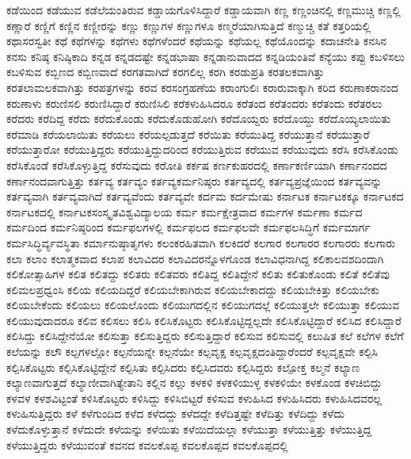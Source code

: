 {ಕಡೆಯಿಂದ
ಕಡೆಯುವ
ಕಡೆಲೆಯಂತಿರುವ
ಕಡ್ಡಾಯಗೊಳಿಸಿದ್ದಾರೆ
ಕಡ್ಡಾಯವಾಗಿ
ಕಣ್ಣ
ಕಣ್ಣಂಚಿನಲ್ಲಿ
ಕಣ್ಣಮುಚ್ಚಿ
ಕಣ್ಣಲ್ಲಿ
ಕಣ್ಣಾರೆ
ಕಣ್ಣಿಗೆ
ಕಣ್ಣಿನ
ಕಣ್ಣೀರನ್ನು
ಕಣ್ಣು
ಕಣ್ಣುಗಳ
ಕಣ್ಣುಗಳೂ
ಕಣ್ಮರೆಯಾಗಿಸುತ್ತಿದೆ
ಕಣ್ಮುಚ್ಚಿ
ಕತೆ
ಕತ್ತರಿಯಲ್ಲಿ
ಕಥಾಸರಸ್ವತೀ
ಕಥೆ
ಕಥೆಗಳನ್ನು
ಕಥೆಗಳು
ಕಥೆಗಳೆಂದರೆ
ಕಥೆಯನ್ನು
ಕಥೆಯಲ್ಲ
ಕಥೆಯೊಂದನ್ನು
ಕದಾಚನೇತಿ
ಕನಸಿನ
ಕನಸು
ಕನಿಷ್ಠ
ಕನಿಷ್ಠಿಕಾದಿ
ಕನ್ನಡ
ಕನ್ನಡದಷ್ಟೇ
ಕನ್ನಡಭಾಷಾ
ಕನ್ನಡಾನುವಾದದ
ಕನ್ನಡಿಯಂತಿವೆ
ಕನ್ಯೆಯು
ಕಪ್ಪು
ಕಬಳಿಸಲು
ಕಬಳಿಸುವ
ಕಬ್ಬಿಣದ
ಕಬ್ಬಿಣವಾದೆ
ಕರಗತವಾಗಿದೆ
ಕರಗಲಿಲ್ಲ
ಕರಗಿ
ಕರಡುಪ್ರತಿ
ಕರತಲಕವಾಗಿತ್ತು
ಕರತಲಾಮಲಕವಾಗಿತ್ತು
ಕರಪತ್ರಗಳನ್ನು
ಕರವ
ಕರಸಂಗ್ರಹಣೆಯ
ಕರಾಂಗುಲಿಃ
ಕರಾರುವಾಕ್ಕಾಗಿ
ಕರಿದ
ಕರುಣಾಕರಾನಂದ
ಕರುಣಾಳು
ಕರುಣಿಸಲಿ
ಕರುಣಿಸಿದ್ದಾರೆ
ಕರುಣಿಸಿಲಿ
ಕರೆಕಳುಹಿಸಿದರೂ
ಕರೆತಂದ
ಕರೆತಂದರು
ಕರೆತಂದು
ಕರೆತರಲು
ಕರೆದರು
ಕರೆದಿದ್ದ
ಕರೆದು
ಕರೆದುಕೊಂಡು
ಕರೆದುಕೊಡುಹೋಗಿ
ಕರೆದೊಯ್ದರು
ಕರೆದೊಯ್ದು
ಕರೆದೊಯ್ಯಲಾಯಿತು
ಕರೆಮಾಡಿ
ಕರೆಯಲಾಯಿತು
ಕರೆಯಲು
ಕರೆಯಲ್ಪಡುತ್ತದೆ
ಕರೆಯಿತು
ಕರೆಯುತಿದ್ದ
ಕರೆಯುತ್ತಾನೆ
ಕರೆಯುತ್ತಾರೆ
ಕರೆಯುತ್ತಾರೋ
ಕರೆಯುತ್ತಿದ್ದರು
ಕರೆಯುತ್ತಿದ್ದುದರಿಂದ
ಕರೆಯುತ್ತಿರುವ
ಕರೆಯುವ
ಕರೆಯುವುದು
ಕರೆಸಿ
ಕರೆಸಿಕೊಂಡು
ಕರೆಸಿಕೊಂಡೆ
ಕರೆಸಿಕೊಳ್ಳುತ್ತಿದ್ದ
ಕರೆಸುವುದು
ಕರೋತಿ
ಕರ್ಕಷ
ಕರ್ಣಕುಹರದಲ್ಲಿ
ಕರ್ಣಾಕರ್ಣಿಯಾಗಿ
ಕರ್ಣಾನಂದದ
ಕರ್ಣಾನಂದವಾಗುತ್ತಿತ್ತು
ಕರ್ತವ್ಯ
ಕರ್ತವ್ಯಂ
ಕರ್ತವ್ಯಕರ್ಮನಿಷ್ಠರು
ಕರ್ತವ್ಯದಲ್ಲಿ
ಕರ್ತವ್ಯಪ್ರಜ್ಞೆಯಿಂದ
ಕರ್ತವ್ಯವನ್ನು
ಕರ್ತವ್ಯವಾಗಿ
ಕರ್ತವ್ಯವಾಗಿದೆ
ಕರ್ತವ್ಯವೆಂದು
ಕರ್ತವ್ಯವೇ
ಕರ್ದಮ
ಕರ್ದಮೇಷು
ಕರ್ನಾಟಕ
ಕರ್ನಾಟಕಕ್ಕೂ
ಕರ್ನಾಟಕದ
ಕರ್ನಾಟಕದಲ್ಲಿ
ಕರ್ನಾಟಕಸಂಸ್ಕೃತವಿಶ್ವವಿದ್ಯಾಲಯ
ಕರ್ಮ
ಕರ್ಮಕ್ಷೇತ್ರವಾದ
ಕರ್ಮಗಳ
ಕರ್ಮಣಾ
ಕರ್ಮದ
ಕರ್ಮದಿಂದ
ಕರ್ಮನಿಷ್ಠರಿಂದ
ಕರ್ಮಫಲಗಳಲ್ಲಿ
ಕರ್ಮಫಲದ
ಕರ್ಮಫಲವೇ
ಕರ್ಮಫಲಸಿದ್ಧಿಗೆ
ಕರ್ಮಮಾರ್ಗ
ಕರ್ಮಸಿದ್ಧಿರ್ವ್ಯವಸ್ಥಿತಾ
ಕರ್ಮಾನುಷ್ಠಾತೃಗಳು
ಕಲಂಕರಹಿತವಾಗಿ
ಕಲಕಿದರೆ
ಕಲಗಾರ
ಕಲಗಾರರ
ಕಲಗಾರರು
ಕಲಗಾರು
ಕಲಾ
ಕಲಾಂ
ಕಲಾತ್ಮಕವಾದ
ಕಲಾಪ
ಕಲಾವಿದರ
ಕಲಾವಿದರನ್ನೊಳಗೊಂಡ
ಕಲಾವಿಧನಾಗಿದ್ದ
ಕಲಿಕಾಲವಶದಿಂದಾಗಿ
ಕಲಿಕೋತ್ಸಾಹಿಗಳ
ಕಲಿತ
ಕಲಿತದ್ದು
ಕಲಿತರು
ಕಲಿತವರು
ಕಲಿತಿದ್ದ
ಕಲಿತಿದ್ದೇನೆ
ಕಲಿತು
ಕಲಿತುಕೊಂಡು
ಕಲಿತೆ
ಕಲಿತೆವು
ಕಲಿಮಲಪ್ರಧ್ವಂಸಿ
ಕಲಿಯ
ಕಲಿಯದಿದ್ದರೆ
ಕಲಿಯಬೇಕಾಗಿರುವ
ಕಲಿಯಬೇಕಾದದ್ದು
ಕಲಿಯಬೇಕಿತ್ತು
ಕಲಿಯಬೇಕು
ಕಲಿಯಬೇಕೆಂದು
ಕಲಿಯಲು
ಕಲಿಯಲೊಂದು
ಕಲಿಯುಗದಲ್ಲಿನ
ಕಲಿಯುಗದಲ್ಲೆ
ಕಲಿಯುತ್ತಲೇ
ಕಲಿಯುತ್ತಾ
ಕಲಿಯುವ
ಕಲಿಯುವುದಾದರೂ
ಕಲಿವ
ಕಲಿಸಲು
ಕಲಿಸಿ
ಕಲಿಸಿಕೊಟ್ಟರು
ಕಲಿಸಿಕೊಟ್ಟಿದ್ದಲ್ಲದೇ
ಕಲಿಸಿಕೊಟ್ಟಿದ್ದಾರೆ
ಕಲಿಸಿದ
ಕಲಿಸಿದ್ದಾರೆ
ಕಲಿಸಿದ್ದು
ಕಲಿಸಿದ್ದೇನೆಯೋ
ಕಲಿಸುತ್ತಾ
ಕಲಿಸುತ್ತಿದ್ದರು
ಕಲಿಸುತ್ತಿದ್ದಾರೆ
ಕಲಿಸುವ
ಕಲಿಸುವಲ್ಲಿ
ಕಲುಷಿತ
ಕಲೆ
ಕಲೆಗಳ
ಕಲೆಗೆ
ಕಲೆಯನ್ನು
ಕಲೌ
ಕಲ್ಪಗಳಲ್ಲೋ
ಕಲ್ಪನೆಯನ್ನೇ
ಕಲ್ಪನೆಯೇ
ಕಲ್ಪವೃಕ್ಷ
ಕಲ್ಪವೃಕ್ಷದಂತಿದ್ದಾರೆಂದರೆ
ಕಲ್ಪವೃಕ್ಷವೇ
ಕಲ್ಪಿಸಿ
ಕಲ್ಪಿಸಿಕೊಟ್ಟರು
ಕಲ್ಪಿಸಿಕೊಟ್ಟಿದ್ದೇನೆ
ಕಲ್ಪಿಸಿತು
ಕಲ್ಪಿಸಿದರು
ಕಲ್ಪಿಸಿದವರು
ಕಲ್ಪಿಸಿದ್ದರು
ಕಲ್ಪೋಕ್ತ
ಕಲ್ಮನೆ
ಕಲ್ಯಾಣ
ಕಲ್ಯಾಣವಾಗುತ್ತದೆ
ಕಲ್ಯಾಣೀವಾಗಿತ್ಯೇತಾನಿ
ಕಲ್ಲಿನ
ಕಲ್ಲು
ಕಳಕಳಿ
ಕಳಕಳಿಯುಳ್ಳ
ಕಳಕಳಿಯೇ
ಕಳಕೊಂಡ
ಕಳಚಿಬಿದ್ದು
ಕಳವಳ
ಕಳಶವಿಟ್ಟಂತೆ
ಕಳಿಸಿಕೊಟ್ಟರು
ಕಳಿಸಿದ್ದು
ಕಳಿಸಿಬಿಟ್ಟರೆ
ಕಳಿಸುವ
ಕಳುಹಿಸಿದ
ಕಳುಹಿಸಿದರು
ಕಳುಹಿಸಿದವರಲ್ಲ
ಕಳುಹಿಸುತ್ತಿದ್ದರು
ಕಳೆ
ಕಳೆಗುಂದಿದ
ಕಳೆದ
ಕಳೆದದ್ದು
ಕಳೆದದ್ದೇ
ಕಳೆದಿತ್ತಷ್ಟೇ
ಕಳೆದಿತ್ತು
ಕಳೆದಿದ್ದು
ಕಳೆದು
ಕಳೆದುಕೊಳ್ಳುತ್ತಾನೆ
ಕಳೆದುದೇ
ಕಳೆಯನ್ನು
ಕಳೆಯಿತು
ಕಳೆಯಿದೆಯಲ್ಲಾ
ಕಳೆಯುತ್ತಾ
ಕಳೆಯುತ್ತಿತ್ತು
ಕಳೆಯುತ್ತಿದ್ದ
ಕಳೆಯುತ್ತಿದ್ದರು
ಕಳೆಯುವಂತೆ
ಕವನದ
ಕವಲಕೊಪ್ಪ
ಕವಲಕೊಪ್ಪದ
ಕವಲಕೊಪ್ಪದಲ್ಲಿ
}
